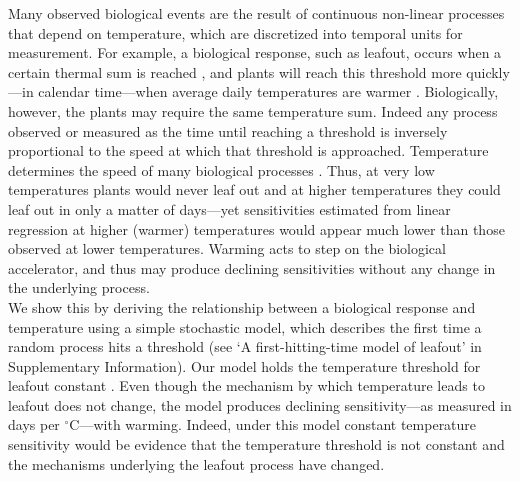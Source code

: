 \documentclass[11pt,letter]{article}
\newcommand{\R}[1]{\label{}\linelabel{#1}} %
\begin{document}
Many observed biological events are the result of continuous non-linear processes that depend on temperature, which are discretized into temporal units for measurement. For example, a biological response, such as leafout, occurs when a certain thermal sum is reached \R{addcites1}\citep{dij1956,lindsey1956}, and plants will reach this threshold more quickly---in calendar time---when average daily temperatures are warmer \R{addcites2}\citep{Lechowicz:1984cr}. %
Biologically, however, the plants may require the same temperature sum. Indeed any process observed or measured as the time until reaching a threshold is inversely proportional to the speed at which that threshold is approached. Temperature determines the speed of many biological processes \R{addcites3}. %
Thus, at very low temperatures plants would never leaf out and at higher temperatures they could leaf out in only a matter of days---yet sensitivities estimated from linear regression at higher (warmer) temperatures would appear much lower than those observed at lower temperatures. Warming acts to step on the biological accelerator, and thus may produce declining sensitivities without any change in the underlying process.  \\ %

We show this by deriving the relationship between a biological response and temperature using a simple stochastic model, which describes the first time a random process hits a threshold (see `A first-hitting-time model of leafout' in Supplementary Information). Our model holds the temperature threshold for leafout constant \R{addcites3}. 
Even though the mechanism by which temperature leads to leafout does not change, the model produces declining sensitivity---as measured in days per $^{\circ}$C---with warming. Indeed, under this model constant temperature sensitivity would be evidence that the temperature threshold is not constant and the mechanisms underlying the leafout process have changed. \\ %
\end{document}
